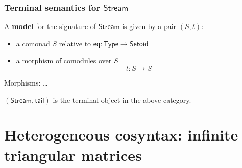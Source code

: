 \documentclass[
]
{beamer}
\newcommand{\constfont}[1]{\ensuremath{\mathsf{#1}}}
\newcommand{\stream}{\constfont{Stream}}
\newcommand{\stail}{\constfont{tail}}
\newcommand{\cosubst}{\constfont{cosubst}}
\newcommand{\comp}[2]{\ensuremath{{#2} \circ {#1}}}
\newcommand{\Setoid}{\constfont{Setoid}}
\newcommand{\eq}{\ensuremath{\mathsf{eq}}}
\newcommand{\Set}{\constfont{Type}}
\newcommand{\fat}[1]{\textbf{#1}}
\begin{document}
%  
% 
%  
% 
%  


\begin{frame}
 \frametitle{Terminal semantics for $\stream$}
 
  \begin{definition}
    A \fat{model} for the signature of $\stream$ is given by a pair $(S,t)$:
    \begin{itemize}
     \item a comonad $S$ relative to $\eq: \Set \to \Setoid$
     \item a morphism of comodules over $S$
        \[  t : S \to S \]
    \end{itemize}
   Morphisms: \ldots
  \end{definition}

 \begin{lemma}
  $(\stream,\stail)$ is the terminal object in the above category.
 \end{lemma}
  
\end{frame}


\section{Heterogeneous cosyntax: infinite triangular matrices}
\end{document}
